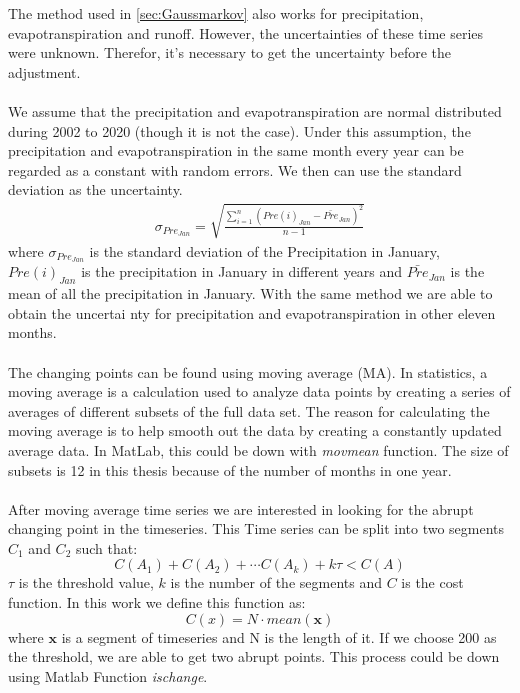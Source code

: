 The method used in \autoref{sec:Gaussmarkov} also works for precipitation, evapotranspiration and runoff. However, the uncertainties of these time series were unknown. Therefor, it's necessary to get the uncertainty before the adjustment. \\\\
We assume that the precipitation and evapotranspiration are normal distributed during 2002 to 2020 (though it is not the case). Under this assumption, the precipitation and evapotranspiration in the same month every year can be regarded as a constant with random errors. We then can use the standard deviation as the uncertainty.
\begin{gather}
\sigma_{Pre_{Jan}} = \sqrt{\frac{\sum_{i=1}^{n} (Pre(i)_{Jan} - \bar{Pre}_{Jan})^2}{n-1}}
\end{gather}
where $\sigma_{Pre_{Jan}}$ is the standard deviation of the Precipitation in January, $Pre(i)_{Jan}$ is the precipitation in January in different years and $\bar{Pre}_{Jan}$ is the mean of all the precipitation in January. With the same method we are able to obtain the uncertai nty for precipitation and evapotranspiration in other eleven months. \\\\
The changing points can be found using moving average (MA). In statistics, a moving average is a calculation used to analyze data points by creating a series of averages of different subsets of the full data set. The reason for calculating the moving average is to help smooth out the data by creating a constantly updated average data. In MatLab, this could be down with \textit{movmean} function. The size of subsets is 12 in this thesis because of the number of months in one year.\\\\
After moving average time series we are interested in looking for the abrupt changing point in the timeseries. This Time series can be split into two segments $C_1$ and $C_2$ such that: \cite{killick2012optimal}
\begin{equation}
	C(A_1) + C(A_2) + \cdots C(A_k) + k \tau < C(A)
\end{equation}
$\tau$ is the threshold value, $k$ is the number of the segments and $C$ is the cost function. In this work we define this function as:
\begin{equation}
	C(x) = N \cdot mean(\bm{x})
\end{equation}
where $\bm{x}$ is a segment of timeseries and N is the length of it. If we choose 200 as the threshold, we are able to get two abrupt points. This process could be down using Matlab Function \textit{ischange}. 
